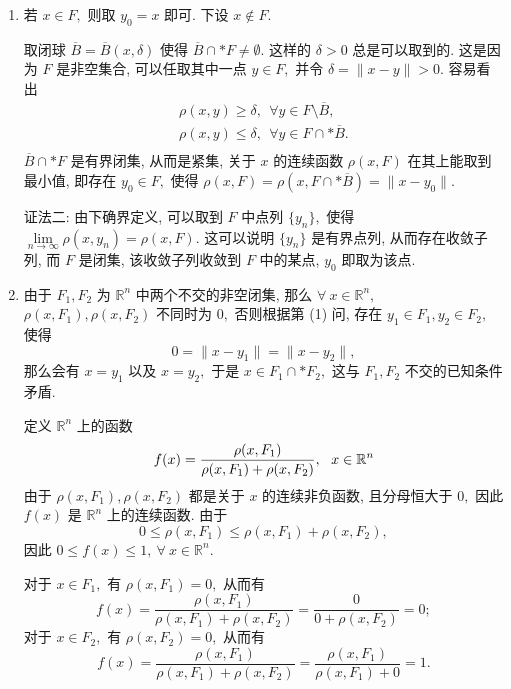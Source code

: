 \begin{solution}
\begin{enumerate}
\item 若 $x \in F,$ 则取 $y_0 = x$ 即可. 下设 $x \not\in F$.

取闭球 $\overline{B} = \overline{B}(x, \delta)$ 使得 $\overline{B} \cap* F \neq \emptyset.$ 这样的 $\delta > 0$ 总是可以取到的. 这是因为 $F$ 是非空集合, 可以任取其中一点 $y \in F,$ 并令 $\delta = \lVert x - y \rVert > 0.$ 容易看出
\begin{equation*}
\begin{gathered}
\rho(x, y) \geqslant \delta, ~~ \forall y \in F \setminus \overline{B}, \\
\rho(x, y) \leqslant \delta, ~~ \forall y \in F \cap* \overline{B}. \\
\end{gathered}
\end{equation*}
$\overline{B} \cap* F$ 是有界闭集, 从而是紧集, 关于 $x$ 的连续函数 $\rho(x, F)$ 在其上能取到最小值, 即存在 $y_0 \in F,$ 使得 $\rho(x, F) = \rho(x, F \cap* \overline{B}) = \lVert x - y_0 \rVert.$ 

证法二: 由下确界定义, 可以取到 $F$ 中点列 $\{y_n\},$ 使得 $\lim\limits_{n\to\infty} \rho(x, y_n) = \rho(x, F).$ 这可以说明 $\{y_n\}$ 是有界点列, 从而存在收敛子列, 而 $F$ 是闭集, 该收敛子列收敛到 $F$ 中的某点, $y_0$ 即取为该点.

\item 由于 $F_1, F_2$ 为 $\mathbb{R}^n$ 中两个不交的非空闭集, 那么 $\forall ~ x \in \mathbb{R}^n,$ $\rho(x, F_1), \rho(x, F_2)$ 不同时为 $0,$ 否则根据第 (1) 问, 存在 $y_1 \in F_1, y_2 \in F_2,$ 使得
\[0 = \lVert x - y_1 \rVert = \lVert x - y_2 \rVert,\]
那么会有 $x = y_1$ 以及 $x = y_2,$ 于是 $x \in F_1 \cap* F_2,$ 这与 $F_1, F_2$ 不交的已知条件矛盾.

定义 $\mathbb{R}^n$ 上的函数
\begin{equation*}
f(x) = \dfrac{\rho(x, F_1)}{\rho(x, F_1) + \rho(x, F_2)}, ~~ x \in \mathbb{R}^n \score{5}
\end{equation*}
由于 $\rho(x, F_1), \rho(x, F_2)$ 都是关于 $x$ 的连续非负函数, 且分母恒大于 $0,$ 因此$f(x)$ 是 $\mathbb{R}^n$ 上的连续函数. 由于
\[0 \leqslant \rho(x, F_1) \leqslant \rho(x, F_1) + \rho(x, F_2),\]
因此 $0 \leqslant f(x) \leqslant 1, ~ \forall ~ x \in \mathbb{R}^n.$

对于 $x \in F_1,$ 有 $\rho(x, F_1) = 0,$ 从而有
\[f(x) = \dfrac{\rho(x, F_1)}{\rho(x, F_1) + \rho(x, F_2)} = \dfrac{0}{0 + \rho(x, F_2)} = 0;\]
对于 $x \in F_2,$ 有 $\rho(x, F_2) = 0,$ 从而有
\[f(x) = \dfrac{\rho(x, F_1)}{\rho(x, F_1) + \rho(x, F_2)} = \dfrac{\rho(x, F_1)}{\rho(x, F_1) + 0} = 1.\]


\end{enumerate}
\end{solution}
